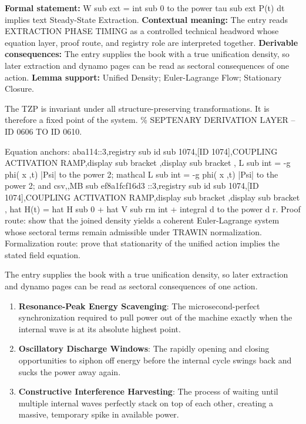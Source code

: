 \begingroup\footnotesize\setlength{\emergencystretch}{3em}\sloppy
\textbf{Formal statement:} W sub ext = int sub 0 to the power tau sub ext P(t) dt implies text Steady-State Extraction. \textbf{Contextual meaning:} The entry reads EXTRACTION PHASE TIMING as a controlled technical headword whose equation layer, proof route, and registry role are interpreted together. \textbf{Derivable consequences:} The entry supplies the book with a true unification density, so later extraction and dynamo pages can be read as sectoral consequences of one action. \textbf{Lemma support:} Unified Density; Euler-Lagrange Flow; Stationary Closure.\par
\endgroup

The TZP is invariant under all structure-preserving transformations. It is therefore a fixed point of the system. \% SEPTENARY DERIVATION LAYER -- ID 0606 TO ID 0610.

Equation anchors: aba114::3,registry sub id sub 1074,[ID 1074],COUPLING ACTIVATION RAMP,display sub bracket ,display sub bracket , L sub int = -g phi( x ,t) |Psi| to the power 2; mathcal L sub int = -g phi( x ,t) |Psi| to the power 2; and csv,,MB sub ef8a1fcf16d3 ::3,registry sub id sub 1074,[ID 1074],COUPLING ACTIVATION RAMP,display sub bracket ,display sub bracket , hat H(t) = hat H sub 0 + hat V sub rm int + integral d to the power d r. Proof route: show that the joined density yields a coherent Euler-Lagrange system whose sectoral terms remain admissible under TRAWIN normalization. Formalization route: prove that stationarity of the unified action implies the stated field equation.

The entry supplies the book with a true unification density, so later extraction and dynamo pages can be read as sectoral consequences of one action.
\endgroup

\begin{enumerate}[leftmargin=1.6em,itemsep=6pt,topsep=4pt]
\item \textbf{Resonance-Peak Energy Scavenging}: The microsecond-perfect synchronization required to pull power out of the machine exactly when the internal wave is at its absolute highest point.
\item \textbf{Oscillatory Discharge Windows}: The rapidly opening and closing opportunities to siphon off energy before the internal cycle swings back and sucks the power away again.
\item \textbf{Constructive Interference Harvesting}: The process of waiting until multiple internal waves perfectly stack on top of each other, creating a massive, temporary spike in available power.
\end{enumerate}

